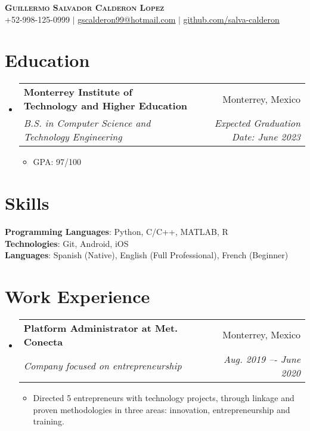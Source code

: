 \documentclass[letterpaper,11pt]{article}
\makeatletter
\newcommand{\resumeItem}[1]{
  \item\small{
    {#1 \vspace{-2pt}}
  }
}
\newcommand{\resumeSubheading}[4]{
  \vspace{-2pt}\item
    \begin{tabular*}{0.97\textwidth}[t]{l@{\extracolsep{\fill}}r}
      \textbf{#1} & #2 \\
      \textit{\small#3} & \textit{\small #4} \\
    \end{tabular*}\vspace{-7pt}
}
\newcommand{\resumeSubHeadingListStart}{\begin{itemize}[leftmargin=0.15in, label={}]}
\newcommand{\resumeSubHeadingListEnd}{\end{itemize}}
\newcommand{\resumeItemListStart}{\begin{itemize}}
\newcommand{\resumeItemListEnd}{\end{itemize}\vspace{-5pt}}
\makeatother
\begin{document}
\begin{center}
    \textbf{\Huge \scshape Guillermo Salvador Calderon Lopez} \\ \vspace{1pt}
    \small +52-998-125-0999 $|$ \href{mailto:gscalderon99@hotmail.com}{\underline{gscalderon99@hotmail.com}} $|$ 
    \href{https://github.com/salva-calderon/}{\underline{github.com/salva-calderon}}
\end{center}


\section{Education}
  \resumeSubHeadingListStart
    \resumeSubheading
      {Monterrey Institute of Technology and Higher Education}{Monterrey, Mexico}
      {B.S. in Computer Science and Technology Engineering}{Expected Graduation Date: June 2023}
      \resumeItemListStart
        \resumeItem{GPA: 97/100}
      \resumeItemListEnd
  \resumeSubHeadingListEnd

\section{Skills}
 \begin{itemize}[leftmargin=0.15in, label={}]
    \small{\item{
     \textbf{Programming Languages}{: Python, C/C++, MATLAB, R} \\
     \textbf{Technologies}{: Git, Android, iOS} \\
     \textbf{Languages}{: Spanish (Native), English (Full Professional), French (Beginner)} \\
    }}
 \end{itemize}

\section{Work Experience}
  \resumeSubHeadingListStart
    \resumeSubheading
      {Platform Administrator at Met. Conecta}{Monterrey, Mexico}
      {Company focused on entrepreneurship}{Aug. 2019 –- June 2020}
      \resumeItemListStart
        \resumeItem{Directed 5 entrepreneurs with technology projects, through linkage and proven methodologies in three areas:  innovation, entrepreneurship and training.}
      \resumeItemListEnd
  \resumeSubHeadingListEnd

\end{document}

